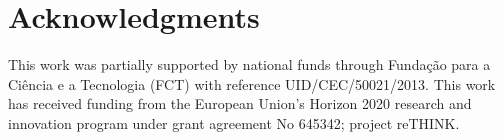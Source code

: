 \documentclass[10pt,conference]{IEEEtran}
\begin{document}
\section*{Acknowledgments}

This work was partially supported by national funds through Fundação para a Ciência e a Tecnologia (FCT) with reference UID/CEC/50021/2013.
This work has received funding from the European Union’s Horizon 2020 research and innovation program under grant agreement No 645342; project reTHINK.





\end{document}
